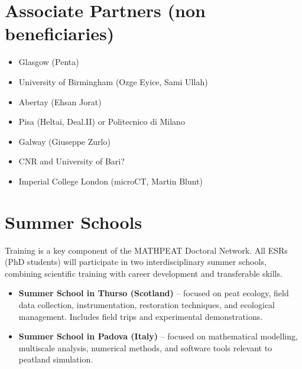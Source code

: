 \documentclass[12pt]{article}
\begin{document}
\section{Associate Partners (non beneficiaries)}
\begin{itemize}
    \item Glasgow (Penta)
    \item University of Birmingham (Ozge Eyice, Sami Ullah)
    \item Abertay (Ehsan Jorat)
    \item Pisa (Heltai, Deal.II) or Politecnico di Milano
    \item Galway (Giuseppe Zurlo)
    \item CNR and University of Bari?
    \item Imperial College London (microCT, Martin Blunt)
\end{itemize}

\section{Summer Schools}
Training is a key component of the MATHPEAT Doctoral Network. All ESRs (PhD students) will participate in two interdisciplinary summer schools, combining scientific training with career development and transferable skills.

\begin{itemize}
    \item \textbf{Summer School in Thurso (Scotland)} – focused on peat ecology, field data collection, instrumentation, restoration techniques, and ecological management. Includes field trips and experimental demonstrations.
    \item \textbf{Summer School in Padova (Italy)} – focused on mathematical modelling, multiscale analysis, numerical methods, and software tools relevant to peatland simulation.
\end{itemize}
\end{document}
